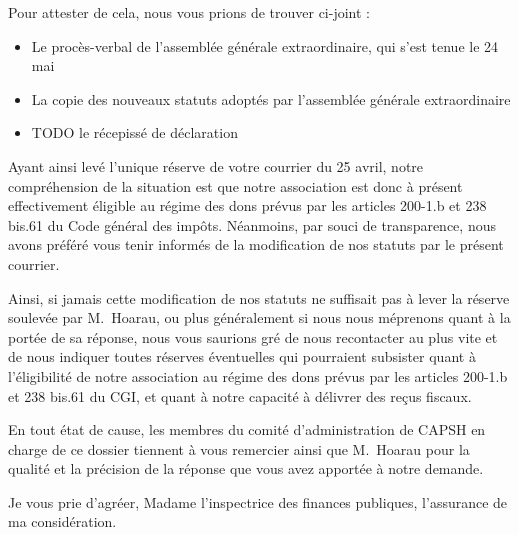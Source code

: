 \documentclass[11pt]{lettre}
\begin{document}
\begin{letter}
Pour attester de cela, nous vous prions de trouver ci-joint :
\nopagebreak
  \begin{itemize}
    \item Le procès-verbal de l'assemblée générale extraordinaire, qui s'est
      tenue le 24 mai
    \item La copie des nouveaux statuts adoptés par l'assemblée générale
      extraordinaire
    \item TODO le récepissé de déclaration
  \end{itemize}

Ayant ainsi levé l'unique réserve de votre courrier du 25 avril, notre
  compréhension de la situation est que notre association est donc à présent
  effectivement éligible au régime des dons prévus par les articles 200-1.b et
  238 bis.61 du Code général des impôts. Néanmoins, par souci de transparence,
  nous avons préféré vous tenir informés de la modification de nos statuts par
  le présent courrier.
  
Ainsi, si jamais cette modification de nos statuts ne suffisait pas à lever la
réserve soulevée par M.\ Hoarau, ou plus généralement si nous nous méprenons
quant à la portée de sa réponse, nous vous saurions gré de nous recontacter au
plus vite et de nous indiquer toutes réserves éventuelles qui pourraient
subsister quant à l'éligibilité de notre association au régime des dons prévus
par les articles 200-1.b et 238 bis.61 du CGI, et quant à notre capacité à
délivrer des reçus fiscaux.

En tout état de cause, les membres du comité d'administration de CAPSH en charge
de ce dossier tiennent à vous remercier ainsi que M.\ Hoarau pour la qualité et
la précision de la réponse que vous avez apportée à notre demande.

Je vous prie d'agréer, Madame l'inspectrice des finances publiques, l'assurance
de ma considération.

\vspace{2cm}

\hspace{10cm}\begin{minipage}{6cm}
\end{minipage}

\thispagestyle{empty}
\end{letter}
\end{document}
